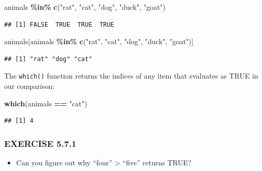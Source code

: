 \documentclass[
]{book}
\newenvironment{Shaded}{\begin{snugshade}}{\end{snugshade}}
\newcommand{\FunctionTok}[1]{\textcolor[rgb]{0.13,0.29,0.53}{\textbf{#1}}}
\newcommand{\NormalTok}[1]{#1}
\newcommand{\SpecialCharTok}[1]{\textcolor[rgb]{0.81,0.36,0.00}{\textbf{#1}}}
\newcommand{\StringTok}[1]{\textcolor[rgb]{0.31,0.60,0.02}{#1}}
\providecommand{\tightlist}{%
  \setlength{\itemsep}{0pt}\setlength{\parskip}{0pt}}
\begin{document}
\begin{Shaded}
\begin{Highlighting}[]
\NormalTok{animals }\SpecialCharTok{\%in\%} \FunctionTok{c}\NormalTok{(}\StringTok{"rat"}\NormalTok{, }\StringTok{"cat"}\NormalTok{, }\StringTok{"dog"}\NormalTok{, }\StringTok{"duck"}\NormalTok{, }\StringTok{"goat"}\NormalTok{)}
\end{Highlighting}
\end{Shaded}

\begin{verbatim}
## [1] FALSE  TRUE  TRUE  TRUE
\end{verbatim}

\begin{Shaded}
\begin{Highlighting}[]
\NormalTok{animals[animals }\SpecialCharTok{\%in\%} \FunctionTok{c}\NormalTok{(}\StringTok{"rat"}\NormalTok{, }\StringTok{"cat"}\NormalTok{, }\StringTok{"dog"}\NormalTok{, }\StringTok{"duck"}\NormalTok{, }\StringTok{"goat"}\NormalTok{)]}
\end{Highlighting}
\end{Shaded}

\begin{verbatim}
## [1] "rat" "dog" "cat"
\end{verbatim}

The \texttt{which()} function returns the indices of any item that evaluates as TRUE in our comparison:

\begin{Shaded}
\begin{Highlighting}[]
\FunctionTok{which}\NormalTok{(animals }\SpecialCharTok{==} \StringTok{"cat"}\NormalTok{)}
\end{Highlighting}
\end{Shaded}

\begin{verbatim}
## [1] 4
\end{verbatim}

\subsubsection*{EXERCISE 5.7.1}\label{exercise-5.7.1}

\begin{itemize}
\tightlist
\item
  Can you figure out why ``four'' \textgreater{} ``five'' returns TRUE?
\end{itemize}
\end{document}
